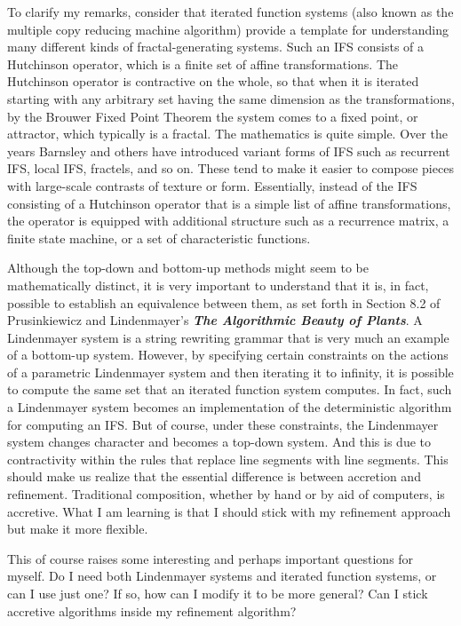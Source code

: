 \documentclass[english,11pt,letterpaper,onecolumn]{scrartcl}
\numberwithin{equation}{section}
\begin{document}
To clarify my remarks, consider that iterated function systems (also known as the multiple copy reducing machine algorithm) provide a template for understanding many different kinds of fractal-generating systems. Such an IFS consists of a Hutchinson operator, which is a finite set of affine transformations. The Hutchinson operator is contractive on the whole, so that when it is iterated starting with any arbitrary set having the same dimension as the transformations, by the Brouwer Fixed Point Theorem the system comes to a fixed point, or attractor, which typically is a fractal. The mathematics is quite simple. Over the years Barnsley and others have introduced variant forms of IFS such as recurrent IFS, local IFS, fractels, and so on. These tend to make it easier to compose pieces with large-scale contrasts of texture or form. Essentially, instead of the IFS consisting of a Hutchinson operator that is a simple list of affine transformations, the operator is equipped with additional structure such as a recurrence matrix, a finite state machine, or a set of characteristic functions.

Although the top-down and bottom-up methods might seem to be mathematically distinct, it is very important to understand that it is, in fact, possible to establish an equivalence between them, as set forth in Section 8.2 of Prusinkiewicz and Lindenmayer's \textit{\textbf{The Algorithmic Beauty of Plants}}. A Lindenmayer system is a string rewriting grammar that is very much an example of a bottom-up system. However, by specifying certain constraints on the actions of a parametric Lindenmayer system and then iterating it to infinity, it is possible to compute the same set that an iterated function system computes. In fact, such a Lindenmayer system becomes an implementation of the deterministic algorithm for computing an IFS. But of course, under these constraints, the Lindenmayer system changes character and becomes a top-down system. And this is due to contractivity within the rules that replace line segments with line segments. This should make us realize that the essential difference is between accretion and refinement. Traditional composition, whether by hand or by aid of computers, is accretive. What I am learning is that I should stick with my refinement approach but make it more flexible.

This of course raises some interesting and perhaps important questions for myself. Do I need both Lindenmayer systems and iterated function systems, or can I use just one? If so, how can I modify it to be more general? Can I stick accretive algorithms inside my refinement algorithm?






\printbibliography
\end{document}
